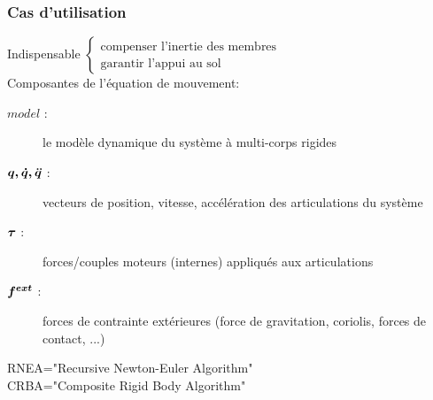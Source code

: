 \documentclass[10pt]{beamer}
\begin{document}
\begin{frame}[allowframebreaks]
  \frametitle{Cas d'utilisation}
  
  Indispensable $\begin{cases}  \text{compenser l'inertie des membres} \\ 
                                \text{garantir l'appui au sol} \end{cases}$  \\
  
  \bigskip
  Composantes de l'équation de mouvement:
  	\begin{description}
	  \item[$model$ :] le modèle dynamique du système à multi-corps rigides
	  \item[$\boldsymbol{q, \dot{q}, \ddot{q}}$ :] vecteurs de position, vitesse, accélération des articulations du système
	  \item[$\boldsymbol{\tau}$ :] forces/couples moteurs (internes) appliqués aux articulations
	  \item[$\boldsymbol{f^{ext}}$ :] forces de contrainte extérieures (force de gravitation, coriolis, forces de contact, ...)
	\end{description}
	\medskip
	\small{RNEA="Recursive Newton-Euler Algorithm" \\
	      CRBA="Composite Rigid Body Algorithm"}
	
	\framebreak
	
	\hypertarget{ch_ID}{}
	

\end{frame}
\end{document}
